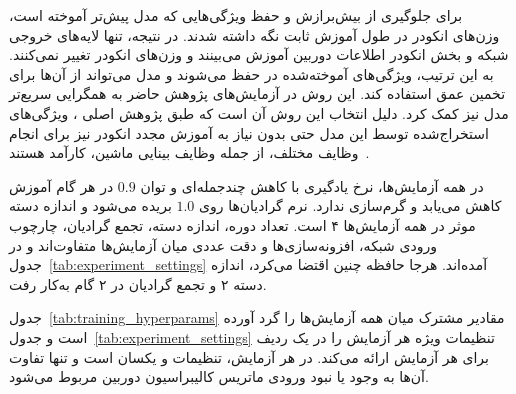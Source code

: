 برای جلوگیری از بیش‌برازش و حفظ ویژگی‌هایی که مدل  پیش‌تر آموخته است، وزن‌های انکودر در طول آموزش ثابت نگه داشته شدند. در نتیجه، تنها لایه‌های خروجی شبکه و بخش انکودر اطلاعات دوربین آموزش می‌بینند و وزن‌های انکودر تغییر نمی‌کنند. به این ترتیب، ویژگی‌های آموخته‌شده در  حفظ می‌شوند و مدل می‌تواند از آن‌ها برای تخمین عمق استفاده کند. این روش در آزمایش‌های پژوهش حاضر به همگرایی سریع‌تر مدل نیز کمک کرد. دلیل انتخاب این روش آن است که طبق پژوهش اصلی ، ویژگی‌های استخراج‌شده توسط این مدل حتی بدون نیاز به آموزش مجدد انکودر نیز برای انجام وظایف مختلف، از جمله وظایف بینایی ماشین، کارآمد هستند~\cite{Oquab2023DINOv2}.



در همه آزمایش‌ها، نرخ یادگیری با کاهش چندجمله‌ای و توان $0.9$ در هر گام آموزش کاهش می‌یابد و گرم‌سازی ندارد. نرم گرادیان‌ها روی $1.0$ بریده می‌شود و اندازه دسته موثر در همه آزمایش‌ها ۴ است. تعداد دوره، اندازه دسته، تجمع گرادیان، چارچوب ورودی شبکه، افزونه‌سازی‌ها و دقت عددی میان آزمایش‌ها متفاوت‌اند و در جدول~\ref{tab:experiment_settings} آمده‌اند. هرجا حافظه چنین اقتضا می‌کرد، اندازه دسته ۲ و تجمع گرادیان در ۲ گام به‌کار رفت.

جدول~\ref{tab:training_hyperparams} مقادیر مشترک میان همه آزمایش‌ها را گرد آورده است و جدول~\ref{tab:experiment_settings} تنظیمات ویژه هر آزمایش را در یک ردیف برای هر آزمایش ارائه می‌کند. در هر آزمایش، تنظیمات \proposedmodel{} و \controlmodel{} یکسان است و تنها تفاوت آن‌ها به وجود یا نبود ورودی ماتریس کالیبراسیون دوربین مربوط می‌شود.

